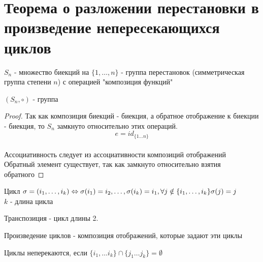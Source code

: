 \section{Теорема о разложении перестановки в произведение непересекающихся циклов}

\begin{Def}
	$S_n$ - множество биекций на $\{1, \dots, n\}$ - группа перестановок (симметрическая группа степени $n$) с операцией "композиция функций"
\end{Def}
\begin{theorem} {}
	$(S_n, \circ)$ - группа
\end{theorem}
\begin{proof}
	Так как композиция биекций - биекция, а обратное отображение к биекции - биекция, то $S_n$ замкнуто относительно этих операций. \\

	$$e = id_{\{1 \dots n \} }$$ \\

	Ассоциативность следует из ассоциативности композиций отображений \\

	Обратный элемент существует, так как замкнуто относительно взятия обратного
\end{proof}

\begin{Def}
	Цикл $\sigma = (i_1, \dots, i_k) \Leftrightarrow \sigma(i_1) = i_2, \dots, \sigma(i_k) = i_1, \forall j \notin \{i_1, \dots, i_k \} \sigma(j) = j $ \\
	$k$ - длина цикла
\end{Def}

\begin{Def}
	Транспозиция - цикл длины 2. \\
\end{Def}

\begin{Def}
	Произведение циклов - композиция отображений, которые задают эти циклы \\
\end{Def}

\begin{Def}
	Циклы неперекаются, если $\{i_1, \dots i_k\} \cap \{j_1 \dots j_k\} = \emptyset$ \\
\end{Def}

